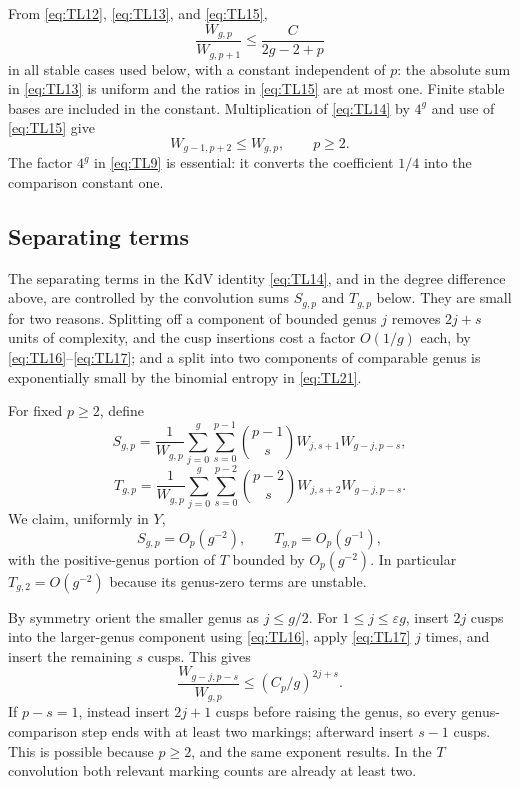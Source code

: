 From \eqref{eq:TL12}, \eqref{eq:TL13}, and \eqref{eq:TL15}, \begin{equation}
\frac{W_{g,p}}{W_{g,p+1}}\le\frac C{2g-2+p}
 \label{eq:TL16}
\end{equation} in all stable cases used below, with a constant independent of \(p\): the absolute sum in \eqref{eq:TL13} is uniform and the ratios in \eqref{eq:TL15} are at most one. Finite stable bases are included in the constant. Multiplication of \eqref{eq:TL14} by \(4^g\) and use of \eqref{eq:TL15} give \begin{equation}
W_{g-1,p+2}\le W_{g,p},\qquad p\ge2.
 \label{eq:TL17}
\end{equation} The factor \(4^g\) in \eqref{eq:TL9} is essential: it converts the coefficient
\(1/4\) into the comparison constant one.

\subsection{Separating terms}\label{fixed-marking-splitting-estimates}

The separating terms in the KdV identity \eqref{eq:TL14}, and in the
degree difference above, are controlled by the convolution sums \(S_{g,p}\)
and \(T_{g,p}\) below. They are small for two reasons. Splitting off a
component of bounded genus \(j\) removes \(2j+s\) units of complexity,
and the cusp insertions cost a factor \(O(1/g)\) each, by
\eqref{eq:TL16}--\eqref{eq:TL17}; and a split
into two components of comparable genus is exponentially small by the
binomial entropy in \eqref{eq:TL21}.

For fixed \(p\ge2\), define \[
 S_{g,p}=\frac1{W_{g,p}}
 \sum_{j=0}^g\sum_{s=0}^{p-1}\binom{p-1}s
 W_{j,s+1}W_{g-j,p-s},
\] \begin{equation}
T_{g,p}=\frac1{W_{g,p}}
 \sum_{j=0}^g\sum_{s=0}^{p-2}\binom{p-2}s
 W_{j,s+2}W_{g-j,p-s}.
 \label{eq:TL18}
\end{equation} We claim, uniformly in \(Y\), \begin{equation}
S_{g,p}=O_p(g^{-2}),\qquad T_{g,p}=O_p(g^{-1}),
 \label{eq:TL19}
\end{equation} with the positive-genus portion of \(T\) bounded by \(O_p(g^{-2})\).
In particular \(T_{g,2}=O(g^{-2})\) because its genus-zero terms are
unstable.

By symmetry orient the smaller genus as \(j\le g/2\). For
\(1\le j\le\varepsilon g\), insert \(2j\) cusps into the larger-genus
component using \eqref{eq:TL16}, apply \eqref{eq:TL17} \(j\) times, and insert the
remaining \(s\) cusps. This gives \begin{equation}
\frac{W_{g-j,p-s}}{W_{g,p}}
 \le (C_p/g)^{2j+s}.
 \label{eq:TL20}
\end{equation} If \(p-s=1\), instead insert \(2j+1\) cusps before raising the genus,
so every genus-comparison step ends with at least two markings;
afterward insert \(s-1\) cusps. This is possible because \(p\ge2\), and
the same exponent results. In the \(T\) convolution both relevant
marking counts are already at least two.

